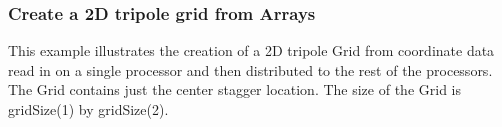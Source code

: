  
\setlength{\oldparskip}{\parskip}
\setlength{\parskip}{1.5ex}
\setlength{\oldparindent}{\parindent}
\setlength{\parindent}{0pt}
\setlength{\oldbaselineskip}{\baselineskip}
\setlength{\baselineskip}{11pt}
 
\def\bv{\begin{verbatim}}
\def\ev{\end{verbatim}}
\def\be{\begin{equation}}
\def\ee{\end{equation}}
\def\bea{\begin{eqnarray}}
\def\eea{\end{eqnarray}}
\def\bi{\begin{itemize}}
\def\ei{\end{itemize}}
\def\bn{\begin{enumerate}}
\def\en{\end{enumerate}}
\def\bd{\begin{description}}
\def\ed{\end{description}}
\def\({\left (}
\def\){\right )}
\def\[{\left [}
\def\]{\right ]}
\def\<{\left  \langle}
\def\>{\right \rangle}
\def\cI{{\cal I}}
\def\diag{\mathop{\rm diag}}
\def\tr{\mathop{\rm tr}}


 

   \subsubsection{Create a 2D tripole grid from Arrays}\label{sec:usage:ex:adv:tripole}
  
   This example illustrates the creation of a 2D tripole Grid from coordinate data
   read in on a single processor and then distributed to the rest of the processors. 
   The Grid contains just the center stagger location. The size of the Grid is gridSize(1) by 
   gridSize(2). 

